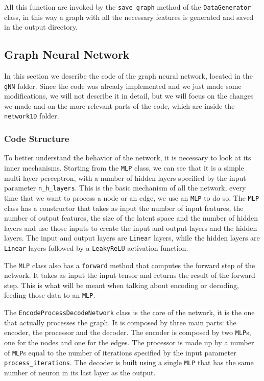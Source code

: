 \documentclass[11pt,a4paper]{article}
\begin{document}
All this function are invoked by the \texttt{save\_graph} method of the \texttt{DataGenerator} class, in this way a graph with all the necessary features is generated and saved in the output directory.

\subsection{Graph Neural Network}
\label{gnn}

In this section we describe the code of the graph neural network, located in the \texttt{gNN} folder. Since the code was already implemented and we just made some modifications, we will not describe it in detail, but we will focus on the changes we made and on the more relevant parts of the code, which are inside the \texttt{network1D} folder.

\subsubsection*{Code Structure}
To better understand the behavior of the network, it is necessary to look at its inner mechanisms. 
Starting from the \texttt{MLP} class, we can see that it is a simple multi-layer perceptron, with a number of hidden layers specified by the input parameter \texttt{n\_h\_layers}. This is the basic mechanism of all the network, every time that we want to process a node or an edge, we use an \texttt{MLP} to do so. 
The \texttt{MLP} class has a constructor that takes as input the number of input features, the number of output features, the size of the latent space and the number of hidden layers and use those inputs to create the input and output layers and the hidden layers. The input and output layers are \texttt{Linear} layers, while the hidden layers are \texttt{Linear} layers followed by a \texttt{LeakyReLU} activation function. 

The \texttt{MLP} class also has a \texttt{forward} method that computes the forward step of the network. It takes as input the input tensor and returns the result of the forward step. This is what will be meant when talking about encoding or decoding, feeding those data to an \texttt{MLP}.


The \texttt{EncodeProcessDecodeNetwork} class is the core of the network, it is the one that actually processes the graph. It is composed by three main parts: the encoder, the processor and the decoder. The encoder is composed by two \texttt{MLP}s, one for the nodes and one for the edges. The processor is made up by a number of \texttt{MLP}s equal to the number of iterations specified by the input parameter \texttt{process\_iterations}. The decoder is built using a single \texttt{MLP} that has the same number of neuron in its last layer as the output.
\end{document}
